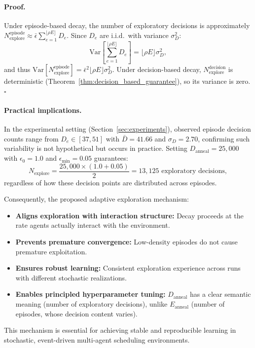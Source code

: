 \paragraph{Proof.}
Under episode-based decay, the number of exploratory decisions is approximately
$N_{\text{explore}}^{\text{episode}} \approx \bar{\epsilon} \sum_{e=1}^{\lfloor \rho E \rfloor} D_e$.
Since $D_e$ are i.i.d.\ with variance $\sigma_D^2$:
\begin{equation}
\mathrm{Var}\!\left[\sum_{e=1}^{\lfloor \rho E \rfloor} D_e\right]
= \lfloor \rho E \rfloor \sigma_D^2,
\end{equation}
and thus
$\mathrm{Var}[N_{\text{explore}}^{\text{episode}}]
= \bar{\epsilon}^2 \lfloor \rho E \rfloor \sigma_D^2$.
Under decision-based decay, $N_{\text{explore}}^{\text{decision}}$ is deterministic
(Theorem~\ref{thm:decision_based_guarantee}), so its variance is zero. $\square$

\paragraph{Practical implications.}
In the experimental setting (Section~\ref{sec:experiments}), observed episode
decision counts range from $D_e \in [37, 51]$ with $\bar{D}=41.66$ and
$\sigma_D=2.70$, confirming such variability is not hypothetical but occurs in
practice. Setting $D_{\mathrm{anneal}}=25{,}000$ with $\epsilon_0=1.0$ and
$\epsilon_{\min}=0.05$ guarantees:
\begin{equation}
N_{\text{explore}}
= \frac{25{,}000 \times (1.0 + 0.05)}{2}
= 13{,}125
\text{ exploratory decisions},
\label{eq:practical_example}
\end{equation}
regardless of how these decision points are distributed across episodes.

Consequently, the proposed adaptive exploration mechanism:
\begin{itemize}
\item \textbf{Aligns exploration with interaction structure:} Decay proceeds at
the rate agents actually interact with the environment.

\item \textbf{Prevents premature convergence:} Low-density episodes do not cause
premature exploitation.

\item \textbf{Ensures robust learning:} Consistent exploration experience across
runs with different stochastic realizations.

\item \textbf{Enables principled hyperparameter tuning:} $D_{\mathrm{anneal}}$ has
a clear semantic meaning (number of exploratory decisions), unlike
$E_{\mathrm{anneal}}$ (number of episodes, whose decision content varies).
\end{itemize}

This mechanism is essential for achieving stable and reproducible learning in
stochastic, event-driven multi-agent scheduling environments.
